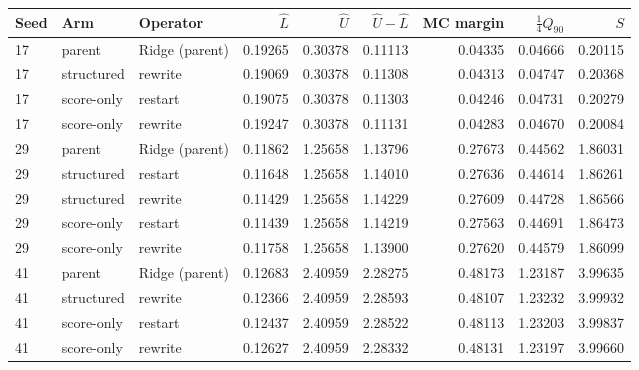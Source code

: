 \begin{tabular}{l l l rrrrrr}
\toprule
Seed & Arm & Operator & $\hat L$ & $\hat U$ & $\hat U-\hat L$ & MC margin & $\tfrac14 Q_{90}$ & $S$ \\
\midrule
17 & parent & Ridge (parent) & 0.19265 & 0.30378 & 0.11113 & 0.04335 & 0.04666 & 0.20115 \\
17 & structured & rewrite & 0.19069 & 0.30378 & 0.11308 & 0.04313 & 0.04747 & 0.20368 \\
17 & score-only & restart & 0.19075 & 0.30378 & 0.11303 & 0.04246 & 0.04731 & 0.20279 \\
17 & score-only & rewrite & 0.19247 & 0.30378 & 0.11131 & 0.04283 & 0.04670 & 0.20084 \\
29 & parent & Ridge (parent) & 0.11862 & 1.25658 & 1.13796 & 0.27673 & 0.44562 & 1.86031 \\
29 & structured & restart & 0.11648 & 1.25658 & 1.14010 & 0.27636 & 0.44614 & 1.86261 \\
29 & structured & rewrite & 0.11429 & 1.25658 & 1.14229 & 0.27609 & 0.44728 & 1.86566 \\
29 & score-only & restart & 0.11439 & 1.25658 & 1.14219 & 0.27563 & 0.44691 & 1.86473 \\
29 & score-only & rewrite & 0.11758 & 1.25658 & 1.13900 & 0.27620 & 0.44579 & 1.86099 \\
41 & parent & Ridge (parent) & 0.12683 & 2.40959 & 2.28275 & 0.48173 & 1.23187 & 3.99635 \\
41 & structured & rewrite & 0.12366 & 2.40959 & 2.28593 & 0.48107 & 1.23232 & 3.99932 \\
41 & score-only & restart & 0.12437 & 2.40959 & 2.28522 & 0.48113 & 1.23203 & 3.99837 \\
41 & score-only & rewrite & 0.12627 & 2.40959 & 2.28332 & 0.48131 & 1.23197 & 3.99660 \\
\bottomrule
\end{tabular}
